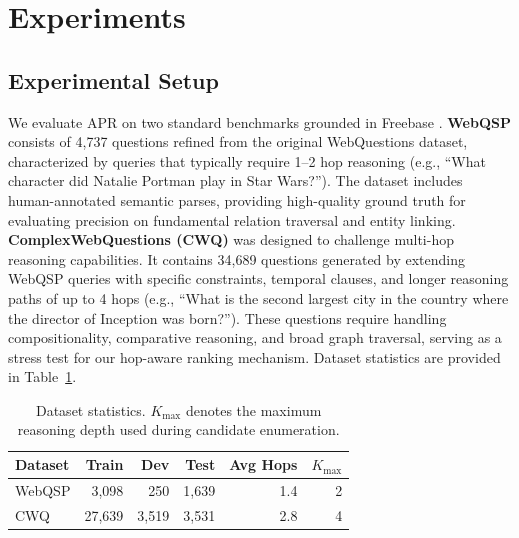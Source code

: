 \documentclass[conference]{IEEEtran}
\newcommand{\model}{\textsc{APR}}
\begin{document}
\section{Experiments}

\subsection{Experimental Setup}

We evaluate \model{} on two standard benchmarks grounded in Freebase \cite{bollacker2008freebase}. \textbf{WebQSP} \cite{yih2016webqsp} consists of 4,737 questions refined from the original WebQuestions dataset, characterized by queries that typically require 1--2 hop reasoning (e.g., “What character did Natalie Portman play in Star Wars?”). The dataset includes human-annotated semantic parses, providing high-quality ground truth for evaluating precision on fundamental relation traversal and entity linking. \textbf{ComplexWebQuestions (CWQ)} \cite{talmor2018cwq} was designed to challenge multi-hop reasoning capabilities. It contains 34,689 questions generated by extending WebQSP queries with specific constraints, temporal clauses, and longer reasoning paths of up to 4 hops (e.g., “What is the second largest city in the country where the director of Inception was born?”). These questions require handling compositionality, comparative reasoning, and broad graph traversal, serving as a stress test for our hop-aware ranking mechanism. Dataset statistics are provided in Table~\ref{tab:datasets}.

\begin{table}[t]
\centering
\caption{Dataset statistics. $K_{\text{max}}$ denotes the maximum reasoning depth used during candidate enumeration.}
\label{tab:datasets}
\begin{tabular}{lrrrrr}
\toprule
Dataset & Train & Dev & Test & Avg Hops & $K_{\text{max}}$ \\
\midrule
WebQSP & 3,098 & 250 & 1,639 & 1.4 & 2 \\
CWQ & 27,639 & 3,519 & 3,531 & 2.8 & 4 \\
\bottomrule
\end{tabular}
\end{table}
\end{document}
